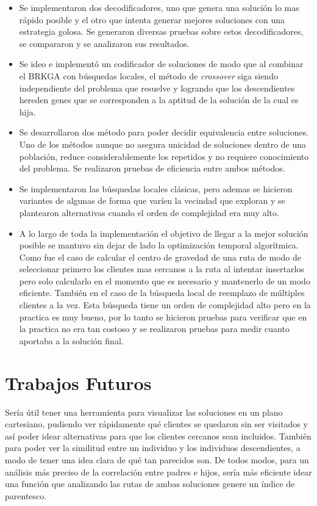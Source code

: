 \bigskip

\begin{itemize}
	\item Se implementaron dos decodificadores, uno que genera una solución lo mas rápido posible y el otro que intenta generar mejores soluciones con una estrategia golosa. Se generaron diversas pruebas sobre estos decodificadores, se compararon y se analizaron sus resultados. 
	\item Se ideo e implementó un codificador de soluciones de modo que al combinar el BRKGA con búsquedas locales, el método de \textit{crossover} siga siendo independiente del problema que resuelve y logrando que los descendientes hereden genes que se corresponden a la aptitud de la solución de la cual es hija. 
	\item Se desarrollaron dos método para poder decidir equivalencia entre soluciones. Uno de los métodos aunque no asegura unicidad de soluciones dentro de una población, reduce considerablemente los repetidos y no requiere conocimiento del problema. Se realizaron pruebas de eficiencia entre ambos métodos.
	\item Se implementaron las búsquedas locales clásicas, pero ademas se hicieron variantes de algunas de forma que varíen la vecindad que exploran y se plantearon alternativas cuando el orden de complejidad era muy alto.
	\item A lo largo de toda la implementación el objetivo de llegar a la mejor solución posible se mantuvo sin dejar de lado la optimización temporal algorítmica. Como fue el caso de calcular el centro de gravedad de una ruta de modo de seleccionar primero los clientes mas cercanos a la ruta al intentar insertarlos pero solo calcularlo en el momento que es necesario y mantenerlo de un modo eficiente. También en el caso de la búsqueda local de reemplazo de múltiples clientes a la vez. Esta búsqueda tiene un orden de complejidad alto pero en la practica es muy bueno, por lo tanto se hicieron pruebas para verificar que en la practica no era tan costoso y se realizaron pruebas para medir cuanto aportaba a la solución final.
\end{itemize}


\section{Trabajos Futuros}

Sería útil tener una herramienta para visualizar las soluciones en un plano cartesiano, pudiendo ver rápidamente qué clientes se quedaron sin ser visitados y así poder idear alternativas para que los clientes cercanos sean incluidos. También para poder ver la similitud entre un individuo y los individuos descendientes, a modo de tener una idea clara de qué tan parecidos son. De todos modos, para un análisis más preciso de la correlación entre padres e hijos, sería más eficiente idear una función que analizando las rutas de ambas soluciones genere un índice de parentesco. 


